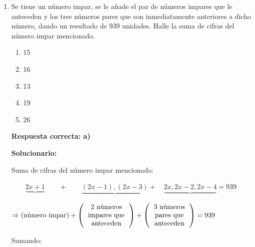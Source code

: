 \begin{enumerate}
	Planteando la primera afirmación:
	
	$(3y + 2x) + 3x = 46$ .....(II)\\
	
	$3y + 5x = 46$ \\
	
	(I) en (II): \\
	$3y + 5(4y) = 46 \Rightarrow y = 2 \Rightarrow x = 8$ \\
	
	$\therefore$ José tiene $3(8) = 24$ años.
	
	\vspace{4mm}
	
	
	
	
	
	
	\item Se tiene un número impar, se le añade el par de números impares que le anteceden y los tres números pares que son inmediatamente anteriores a dicho número, dando un resultado de 939 unidades. Halle la suma de cifras del número impar mencionado.
	
	\begin{enumerate}[label=\alph*)]
		\item 15
		\item 16
		\item 13
		\item 19
		\item 26
	\end{enumerate}
	\textbf{Respuesta correcta: a)}
	
	\vspace{2mm}
	\textbf{Solucionario:}
	
	Suma de cifras del número impar mencionado:
	
	$\qquad\underbrace{2x+1}_{} \quad \quad +\qquad \underbrace{(2x-1), (2x-3)}_{} +\quad \underbrace{2x, 2x-2, 2x-4}_{} = 939$
	
	$\Rightarrow \left( \text{número impar} \right) + \left( \begin{tabular}{c} 2 números \\ impares que \\ anteceden \end{tabular} \right) + \left( \begin{tabular}{c} 3 números \\ pares que \\ anteceden \end{tabular} \right) = 939$
	
	
	\vspace{2mm}
	Sumando:
	

\end{enumerate}
